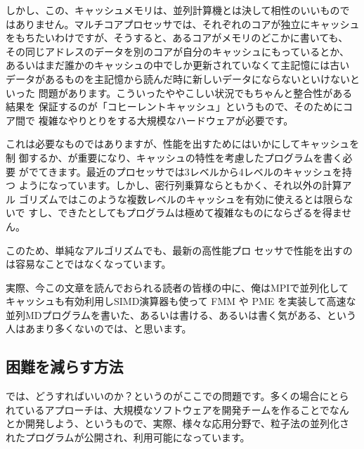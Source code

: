\documentclass[twocolumn,10pt]{jarticle}
\begin{document}
しかし、この、キャッシュメモリは、並列計算機とは決して相性のいいもので
はありません。マルチコアプロセッサでは、それぞれのコアが独立にキャッシュ
をもちたいわけですが、そうすると、あるコアがメモリのどこかに書いても、
その同じアドレスのデータを別のコアが自分のキャッシュにもっているとか、
あるいはまだ誰かのキャッシュの中でしか更新されていなくて主記憶には古い
データがあるものを主記憶から読んだ時に新しいデータにならないといけないといった
問題があります。こういったややこしい状況でもちゃんと整合性がある結果を
保証するのが「コヒーレントキャッシュ」というもので、そのためにコア間で
複雑なやりとりをする大規模なハードウェアが必要です。

これは必要なものではありますが、性能を出すためにはいかにしてキャッシュを制
御するか、が重要になり、キャッシュの特性を考慮したプログラムを書く必要
がでてきます。最近のプロセッサでは3レベルから4レベルのキャッシュを持つ
ようになっています。しかし、密行列乗算ならともかく、それ以外の計算アル
ゴリズムではこのような複数レベルのキャッシュを有効に使えるとは限らないで
すし、できたとしてもプログラムは極めて複雑なものにならざるを得ません。

このため、単純なアルゴリズムでも、最新の高性能プロ
セッサで性能を出すのは容易なことではなくなっています。

実際、今この文章を読んでおられる読者の皆様の中に、俺はMPIで並列化して
キャッシュも有効利用しSIMD演算器も使って FMM や PME を実装して高速な
並列MDプログラムを書いた、あるいは書ける、あるいは書く気がある、という
人はあまり多くないのでは、と思います。



\subsection{困難を減らす方法}

では、どうすればいいのか？というのがここでの問題です。多くの場合にとら
れているアプローチは、大規模なソフトウェアを開発チームを作ることでなん
とか開発しよう、というもので、実際、様々な応用分野で、粒子法の並列化さ
れたプログラムが公開され、利用可能になっています。
\end{document}
